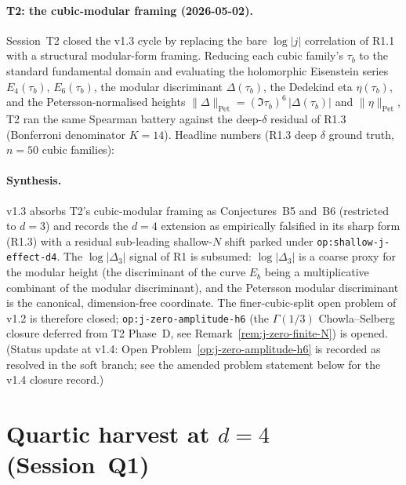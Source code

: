\documentclass[11pt,a4paper]{article}
\theoremstyle{definition}
\theoremstyle{remark}
\begin{document}


\paragraph{T2: the cubic-modular framing
(2026-05-02).}\label{para:T2-cubic-modular}
Session~T2 closed the v1.3 cycle by replacing the bare $\log|j|$
correlation of R1.1 with a structural modular-form framing. Reducing
each cubic family's $\tau_b$ to the standard fundamental domain and
evaluating the holomorphic Eisenstein series $E_4(\tau_b)$,
$E_6(\tau_b)$, the modular discriminant $\Delta(\tau_b)$, the
Dedekind eta $\eta(\tau_b)$, and the Petersson-normalised heights
$\|\Delta\|_{\mathrm{Pet}} = (\Im\tau_b)^6\,|\Delta(\tau_b)|$ and
$\|\eta\|_{\mathrm{Pet}}$, T2 ran the same Spearman battery against
the deep-$\delta$ residual of R1.3 (Bonferroni denominator $K=14$).
Headline numbers (R1.3 deep $\delta$ ground truth, $n=50$
cubic families):




\paragraph{Synthesis.}
v1.3 absorbs T2's cubic-modular framing as Conjectures~B5 and~B6
(restricted to $d=3$) and records the $d=4$ extension as
empirically falsified in its sharp form (R1.3) with a residual
sub-leading shallow-$N$ shift parked under
\texttt{op:shallow-j-effect-d4}. The $\log|\Delta_3|$ signal of R1
is subsumed: $\log|\Delta_3|$ is a coarse proxy for the modular
height (the discriminant of the curve $E_b$ being a multiplicative
combinant of the modular discriminant), and the Petersson modular
discriminant is the canonical, dimension-free coordinate. The
finer-cubic-split open problem of v1.2 is therefore closed;
\texttt{op:j-zero-amplitude-h6} (the $\Gamma(1/3)$ Chowla--Selberg
closure deferred from T2 Phase~D, see
Remark~\ref{rem:j-zero-finite-N}) is opened.
(Status update at v1.4: Open Problem~\ref{op:j-zero-amplitude-h6} is
recorded as resolved in the soft branch; see the amended problem
statement below for the v1.4 closure record.)

\section{Quartic harvest at $d=4$ (Session~Q1)}\label{sec:Q1-quartic}
\end{document}
